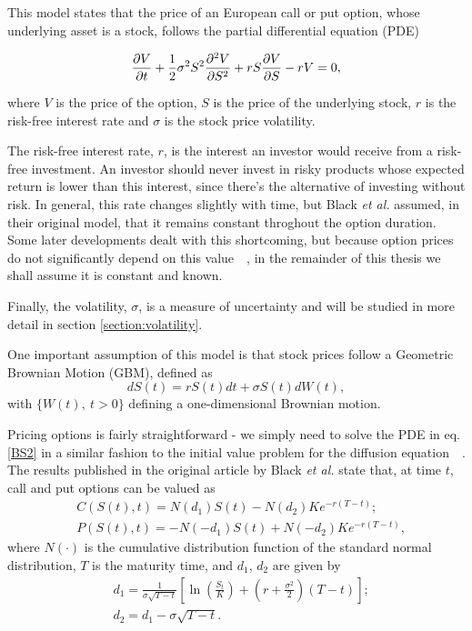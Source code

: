 This model states that the price of an European call or put option, whose underlying asset is a stock, follows the partial differential equation (PDE)

\begin{equation}\label{BS2}
\pdv{V}{t}+\frac{1}{2}\sigma^2S^2\pdv{^2V}{S^2}+rS\pdv{V}{S}-rV=0,
\end{equation}

\noindent where $V$ is the price of the option, $S$ is the price of the underlying stock, $r$ is the risk-free interest rate and $\sigma$ is the stock price volatility.

The risk-free interest rate, $r$, is the interest an investor would receive from a risk-free investment. An investor should never invest in risky products whose expected return is lower than this interest, since there's the alternative of investing without risk. In general, this rate changes slightly with time, but Black \textit{et al.} assumed, in their original model, that it remains constant throghout the option duration. Some later developments dealt with this shortcoming, but because option prices do not significantly depend on this value~~\cite{Wilmott}, in the remainder of this thesis we shall assume it is constant and known.

Finally, the volatility, $\sigma$, is a measure of uncertainty and will be studied in more detail in section \ref{section:volatility}.

One important assumption of this model is that stock prices follow a Geometric Brownian Motion (GBM), defined as
\begin{equation}\label{GBM}
dS(t)=rS(t)dt+\sigma S(t)dW(t),
\end{equation}
\noindent with $\{W(t),\ t>0\}$ defining a one-dimensional Brownian motion.


Pricing options is fairly straightforward - we simply need to solve the PDE in eq. \eqref{BS2} in a similar fashion to the initial value problem for the diffusion equation~~\cite{Dilao}.
The results published in the original article by Black \textit{et al.} state that, at time $t$, call and put options can be valued as
\begin{equation}\label{callputBS}
\begin{split}
&C(S(t),t)=N(d_1)S(t)-N(d_2)Ke^{-r(T-t)};\\
&P(S(t),t)=-N(-d_1)S(t)+N(-d_2)Ke^{-r(T-t)},
\end{split}
\end{equation}
\noindent where $N(\cdot)$ is the cumulative distribution function of the standard normal distribution, $T$ is the maturity time, and $d_1$, $d_2$ are given by
\begin{equation}\label{d1d2}
\begin{split}
&d_1=\frac{1}{\sigma\sqrt{T-t}}\left[\ln\left(\frac{S_t}{K}\right)+\left(r+\frac{\sigma^2}{2}\right)(T - t)\right];\\
&d_2=d_1-\sigma\sqrt{T-t}.\\
\end{split}
\end{equation}



